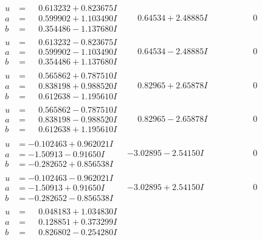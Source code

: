 \documentclass[1p]{elsarticle_modified}
\theoremstyle{definition}
\begin{document}
$$\begin{array}{c|c|c}
\begin{aligned}
u &= \phantom{-}0.613232 + 0.823675 I \\
a &= \phantom{-}0.599902 + 1.103490 I \\
b &= \phantom{-}0.354486 - 1.137680 I\end{aligned}
 & \phantom{-}0.64534 + 2.48885 I & \phantom{-0.000000 } 0 \\ \hline\begin{aligned}
u &= \phantom{-}0.613232 - 0.823675 I \\
a &= \phantom{-}0.599902 - 1.103490 I \\
b &= \phantom{-}0.354486 + 1.137680 I\end{aligned}
 & \phantom{-}0.64534 - 2.48885 I & \phantom{-0.000000 } 0 \\ \hline\begin{aligned}
u &= \phantom{-}0.565862 + 0.787510 I \\
a &= \phantom{-}0.838198 + 0.988520 I \\
b &= \phantom{-}0.612638 - 1.195610 I\end{aligned}
 & \phantom{-}0.82965 + 2.65878 I & \phantom{-0.000000 } 0 \\ \hline\begin{aligned}
u &= \phantom{-}0.565862 - 0.787510 I \\
a &= \phantom{-}0.838198 - 0.988520 I \\
b &= \phantom{-}0.612638 + 1.195610 I\end{aligned}
 & \phantom{-}0.82965 - 2.65878 I & \phantom{-0.000000 } 0 \\ \hline\begin{aligned}
u &= -0.102463 + 0.962021 I \\
a &= -1.50913 - 0.91650 I \\
b &= -0.282652 + 0.856538 I\end{aligned}
 & -3.02895 - 2.54150 I & \phantom{-0.000000 } 0 \\ \hline\begin{aligned}
u &= -0.102463 - 0.962021 I \\
a &= -1.50913 + 0.91650 I \\
b &= -0.282652 - 0.856538 I\end{aligned}
 & -3.02895 + 2.54150 I & \phantom{-0.000000 } 0 \\ \hline\begin{aligned}
u &= \phantom{-}0.048183 + 1.034830 I \\
a &= \phantom{-}0.128851 + 0.373299 I \\
b &= \phantom{-}0.826802 - 0.254280 I\end{aligned}

\end{array}$$
\end{document}
